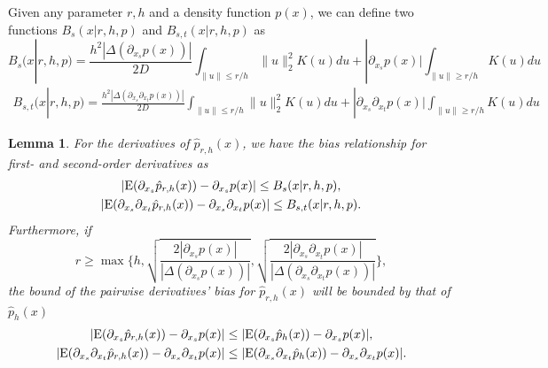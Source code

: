 \documentclass[aos,preprint]{imsart}
\newtheorem{lemma}[theorem]{Lemma}
\theoremstyle{remark}
\begin{document}
Given any parameter $r,h$ and a density function $p(x)$, we can define two functions $B_s(x| r,h, p)$ and $B_{s,t}(x| r,h, p)$ as
\[
B_s(x| r,h, p)  = \frac{h^2|\Delta (\partial_{x_s}p(x))|}{2D} \int_{\|u\|\leq r /h} \|u\|_2^2 K(u) du
+ |\partial_{x_s} p(x)| \int_{\|u\|\geq r/h} K(u) du
\]
\begin{multline*}
B_{s,t}(x|r,h, p) = \frac{h^2|\Delta (\partial_{x_s}\partial_{x_t} p(x))|}{2D}  \int_{\|u\|\leq r /h} \|u\|_2^2 K(u) du
 + |\partial_{x_s} \partial_{x_t} p(x)| \int_{\|u\|\geq r/h} K(u) du
\end{multline*}
\begin{lemma} \label{lSCRE}For the derivatives of $\hat{p}_{r,h}(x)$, we have the bias relationship for first- and second-order derivatives as
\begin{gather*}\label{order11}
|{\rm E}( \partial_{x_s}  \hat{p}_{r,h}(x)) -  \partial_{x_s } p(x)|  \leq B_s(x| r,h, p)  ,\\
|{\rm E} (\partial_{x_s} \partial_{x_t}   \hat{p}_{r, h}(x)) -  \partial_{x_s} \partial_{x_t} p(x)| \leq B_{s,t}(x| r,h, p).
\end{gather*}
Furthermore, if  
\begin{equation}\label{condition1}
r \geq\max \{ h, \sqrt{\frac{2|\partial_{x_s} p(x)|}{ |\Delta(\partial_{x_s} p(x))|}} , \sqrt{\frac{2|\partial_{x_s} \partial_{x_t} p(x)|}{ |\Delta(\partial_{x_s}\partial_{x_t} p(x))|}}\},
\end{equation}
the bound of the pairwise derivatives' bias for $\hat{p}_{r,h}(x)$ %
will be bounded by that of $\hat{p}_h(x)$%
\begin{gather}\label{bias_bound2}
|{\rm E}( \partial_{x_s}  \hat{p}_{r,h}(x)) -  \partial_{x_s } p(x)| \leq |{\rm E}( \partial_{x_s}  \hat{p}_{h}(x)) -  \partial_{x_s } p(x)|,\\
|{\rm E}( \partial_{x_s} \partial_{x_t} \hat{p}_{r,h}(x)) - \partial_{x_s} \partial_{x_t} p(x)| \leq |{\rm E}( \partial_{x_s}  \partial_{x_t} \hat{p}_{h}(x)) -  \partial_{x_s }\partial_{x_t} p(x)|.\label{bias_bound3}
\end{gather}
\end{lemma}
\end{document}
